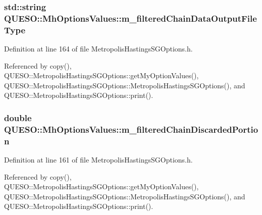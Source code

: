 \hypertarget{class_q_u_e_s_o_1_1_mh_options_values_adc3052dc0f1c2fd5072cb415a0eb3265}{
\subsubsection[{m\-\_\-filtered\-Chain\-Data\-Output\-File\-Type}]{\setlength{\rightskip}{0pt plus 5cm}std\-::string Q\-U\-E\-S\-O\-::\-Mh\-Options\-Values\-::m\-\_\-filtered\-Chain\-Data\-Output\-File\-Type}}\label{class_q_u_e_s_o_1_1_mh_options_values_adc3052dc0f1c2fd5072cb415a0eb3265}


Definition at line 164 of file Metropolis\-Hastings\-S\-G\-Options.\-h.



Referenced by copy(), Q\-U\-E\-S\-O\-::\-Metropolis\-Hastings\-S\-G\-Options\-::get\-My\-Option\-Values(), Q\-U\-E\-S\-O\-::\-Metropolis\-Hastings\-S\-G\-Options\-::\-Metropolis\-Hastings\-S\-G\-Options(), and Q\-U\-E\-S\-O\-::\-Metropolis\-Hastings\-S\-G\-Options\-::print().

\hypertarget{class_q_u_e_s_o_1_1_mh_options_values_afdaa37947c3a5c5acc11b89fa0a98fb9}{
\subsubsection[{m\-\_\-filtered\-Chain\-Discarded\-Portion}]{\setlength{\rightskip}{0pt plus 5cm}double Q\-U\-E\-S\-O\-::\-Mh\-Options\-Values\-::m\-\_\-filtered\-Chain\-Discarded\-Portion}}\label{class_q_u_e_s_o_1_1_mh_options_values_afdaa37947c3a5c5acc11b89fa0a98fb9}


Definition at line 161 of file Metropolis\-Hastings\-S\-G\-Options.\-h.



Referenced by copy(), Q\-U\-E\-S\-O\-::\-Metropolis\-Hastings\-S\-G\-Options\-::get\-My\-Option\-Values(), Q\-U\-E\-S\-O\-::\-Metropolis\-Hastings\-S\-G\-Options\-::\-Metropolis\-Hastings\-S\-G\-Options(), and Q\-U\-E\-S\-O\-::\-Metropolis\-Hastings\-S\-G\-Options\-::print().


